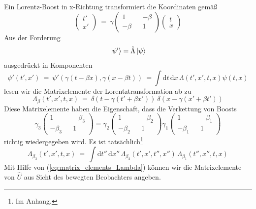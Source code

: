 \documentclass[12pt]{article}
\begin{document}
Ein Lorentz-Boost in x-Richtung transformiert die Koordinaten gemäß
\begin{equation*}
\begin{pmatrix} t' \\ x' \end{pmatrix}\ =\ 
\gamma \begin{pmatrix} 1 && -\beta \\ -\beta && 1 \end{pmatrix}
\begin{pmatrix} t \\ x \end{pmatrix}
\end{equation*}
Aus der Forderung 
\begin{equation*}
\ket{\psi'}=\hat{\Lambda}\ket{\psi}
\end{equation*}
ausgedrückt in Komponenten
\begin{equation*}
\psi'(t',x')\ =\ \psi'(\gamma(t-\beta x),\gamma(x-\beta t))\ = \int \mathrm{d}t\,\mathrm{d}x\, \Lambda(t',x',t,x) \psi(t,x)
\end{equation*}
lesen wir die Matrixelemente der Lorentztransformation ab zu
\begin{equation}\label{eq:matrix_elements_Lambda}
\Lambda_\beta(t',x',t,x)\ =\ \delta(t-\gamma(t'+\beta x'))\ \delta(x-\gamma(x'+\beta t'))
\end{equation}
Diese Matrixelemente haben die Eigenschaft, dass die Verkettung von Boosts
\begin{equation*}
\gamma_3 \begin{pmatrix} 1 && -\beta_3 \\ -\beta_3 && 1 \end{pmatrix} =
\gamma_2 \begin{pmatrix} 1 && -\beta_2 \\ -\beta_2 && 1 \end{pmatrix}
\gamma_1 \begin{pmatrix} 1 && -\beta_1 \\ -\beta_1 && 1 \end{pmatrix}
\end{equation*}
richtig wiedergegeben wird. Es ist tatsächlich\footnote{Im Anhang.}
\begin{equation} \label{eq:chained_boosts}
\Lambda_{\beta_3}(t',x',t,x)\ =\ \int \mathrm{d}t''\,\mathrm{d}x''\, \Lambda_{\beta_2}(t',x',t'',x'')\, \Lambda_{\beta_1}(t'',x'',t,x)
\end{equation}
Mit Hilfe von (\ref{eq:matrix_elements_Lambda}) können wir die Matrixelemente von $\hat{U}$ aus Sicht des bewegten Beobachters angeben.
\end{document}
